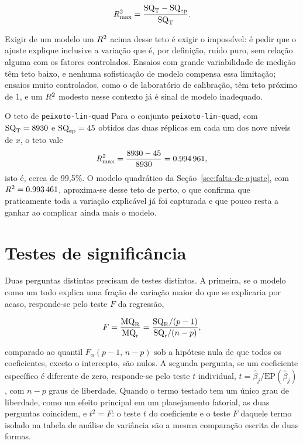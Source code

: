 \documentclass{doeapostila}
\begin{document}
\begin{equation}
  R^{2}_{\max} = \frac{\mathrm{SQ}_{\mathrm{T}} - \mathrm{SQ}_{\mathrm{ep}}}{\mathrm{SQ}_{\mathrm{T}}} .
  \label{eq:teto-r2}
\end{equation}

Exigir de um modelo um $R^{2}$ acima desse teto é exigir o impossível: é
pedir que o ajuste explique inclusive a variação que é, por definição,
ruído puro, sem relação alguma com os fatores controlados. Ensaios com
grande variabilidade de medição têm teto baixo, e nenhuma sofisticação de
modelo compensa essa limitação; ensaios muito controlados, como o de
laboratório de calibração, têm teto próximo de 1, e um $R^{2}$
modesto nesse contexto já é sinal de modelo inadequado.

\begin{aplicacao}{O teto de \texttt{peixoto-lin-quad}}
  Para o conjunto \texttt{peixoto-lin-quad}, com $\mathrm{SQ}_{\mathrm{T}} = \num{8930}$ e
  $\mathrm{SQ}_{\mathrm{ep}} = \num{45}$ obtidos das duas réplicas em cada um dos nove níveis
  de $x$, o teto vale
  \[
    R^{2}_{\max} = \frac{8930 - 45}{8930} = \num{0.994961} ,
  \]
  isto é, cerca de 99{,}5\%. O modelo quadrático da
  Seção~\ref{sec:falta-de-ajuste}, com $R^{2} = \num{0.993461}$, aproxima-se
  desse teto de perto, o que confirma que praticamente toda a variação
  explicável já foi capturada e que pouco resta a ganhar ao complicar ainda
  mais o modelo.
\end{aplicacao}

\section{Testes de significância}
\label{sec:testes-significancia}

Duas perguntas distintas precisam de testes distintos. A primeira, se o
modelo como um todo explica uma fração de variação maior do que se
explicaria por acaso, responde-se pelo teste $F$ da regressão,

\begin{equation}
  F = \frac{\mathrm{MQ}_{\mathrm{R}}}{\mathrm{MQ}_{\mathrm{r}}} = \frac{\mathrm{SQ}_{\mathrm{R}}/(p-1)}{\mathrm{SQ}_{\mathrm{r}}/(n-p)} ,
  \label{eq:teste-f}
\end{equation}

comparado ao quantil $F_{\alpha}(p-1,\,n-p)$ sob a hipótese nula de que
todos os coeficientes, exceto o intercepto, são nulos. A segunda pergunta,
se um coeficiente específico é diferente de zero, responde-se pelo teste
$t$ individual, $t = \hat{\beta}_j / \mathrm{EP}(\hat{\beta}_j)$, com
$n-p$ graus de liberdade. Quando o termo testado tem um único grau de
liberdade, como um efeito principal em um planejamento fatorial, as duas
perguntas coincidem, e $t^{2} = F$: o teste $t$ do coeficiente e o teste
$F$ daquele termo isolado na tabela de análise de variância são a mesma
comparação escrita de duas formas.
\end{document}
